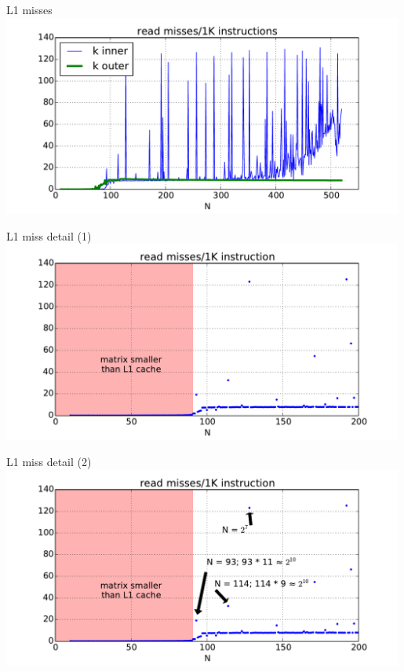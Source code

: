 \begin{frame}{L1 misses}
\includegraphics[width=0.99\textwidth]{../caching/k-inout-l1d_read_miss_rate}
\end{frame}

\begin{frame}{L1 miss detail (1)}
\includegraphics[width=0.99\textwidth]{../caching/k-in-l1d-miss-annot-size}
\end{frame}

\begin{frame}{L1 miss detail (2)}
\includegraphics[width=0.99\textwidth]{../caching/k-in-l1d-miss-annot4-size}
\end{frame}

